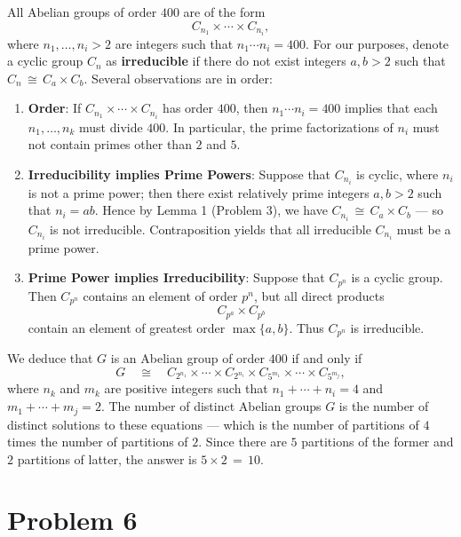 \documentclass[11pt]{article}
\begin{document}
All Abelian groups of order $400$ are of the form
\[
  C_{n_{1}} \times \cdots \times C_{n_{i}},
\]
where $n_{1}, \ldots, n_{i} > 2$ are integers such that $n_{1} \cdots n_{i} = 400$. For our purposes, denote a cyclic group $C_{n}$ as \textbf{irreducible} if there do not exist integers $a, b > 2$ such that $C_{n} \, \cong \, C_{a} \times C_{b}$. Several observations are in order:
\begin{enumerate}
  \item \textbf{Order}: If $C_{n_{1}} \times \cdots \times C_{n_{i}}$ has order $400$, then $n_{1} \cdots n_{i} = 400$ implies that each $n_{1}, \ldots, n_{k}$ must divide $400$. In particular, the prime factorizations of $n_{i}$ must not contain primes other than $2$ and $5$.
  \item \textbf{Irreducibility implies Prime Powers}: Suppose that $C_{n_{i}}$ is cyclic, where $n_{i}$ is not a prime power; then there exist relatively prime integers $a, b > 2$ such that $n_{i} = ab$. Hence by Lemma 1 (Problem 3), we have $C_{n_{i}} \, \cong \, C_{a} \times C_{b}$ --- so $C_{n_{i}}$ is not irreducible. Contraposition yields that all irreducible $C_{n_{i}}$ must be a prime power.

  \item \textbf{Prime Power implies Irreducibility}: Suppose that $C_{p^{n}}$ is a cyclic group. Then $C_{p^{n}}$ contains an element of order $p^{n}$, but all direct products
  \[
    C_{p^{a}} \times C_{p^{b}}
  \]
  contain an element of greatest order $\max \{ a, b \}$. Thus $C_{p^{n}}$ is irreducible.
\end{enumerate}
We deduce that $G$ is an Abelian group of order $400$ if and only if
\[
  G \quad \cong \quad C_{2^{n_{1}}} \times \cdots \times  C_{2^{n_{i}}} \times C_{5^{m_{1}}} \times \cdots \times C_{5^{m_{j}}},
\]
where $n_{k}$ and $m_{k}$ are positive integers such that $n_{1} + \cdots + n_{i} = 4$ and $m_{1} + \cdots + m_{j} = 2$. The number of distinct Abelian groups $G$ is the number of distinct solutions to these equations --- which is the number of partitions of $4$ times the number of partitions of $2$. Since there are $5$ partitions of the former and $2$ partitions of latter, the answer is $5 \times 2 \, = \, \boxed{10}$.


\section{Problem 6}
\end{document}
